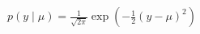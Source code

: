\documentclass[preview]{standalone}
\begin{document}
\begin{align*}
p(y \mid \mu)=\frac{1}{\sqrt{2 \pi}} \exp (-\frac{1}{2}(y-\mu)^2)
\end{align*}
\end{document}
